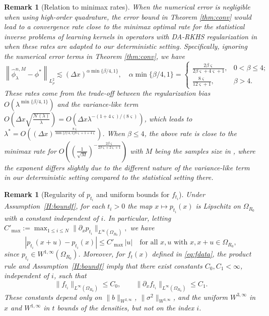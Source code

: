 \documentclass[12pt]{article}
\newtheorem{remark}[theorem]{Remark}
\numberwithin{equation}{section}
\numberwithin{theorem}{section}
\begin{document}
\begin{remark}[Relation to minimax rates]
\label{rem:minimax}
When the numerical error is negligible when using high-order quadrature, the error bound in Theorem \ref{thm:conv} would lead to a convergence rate close to the minimax optimal rate for the statistical inverse problems of learning kernels in operators with DA-RKHS regularization in {\rm\cite{zhang2025minimax}} when these rates are adapted to our deterministic setting. Specifically, ignoring the numerical error terms in Theorem \ref{thm:conv}, we have
$$
\left\|\hat{\phi}_\lambda^{n, M}-\phi^*\right\|_{L^2_{\rho}} 
\lesssim (\Delta x)^{\alpha \min \{\beta / 4,1\}}, 
\quad  
\alpha \min \{\beta / 4,1\}
= \begin{cases}
    \frac{2 \beta \varsigma}{2 \beta \varsigma+4 \varsigma+1}, & 0<\beta \leq 4;  \\ 
       \frac{8 \varsigma}{12 \varsigma+1}, & \beta>4 .
    \end{cases}
$$ 
These rates come from the trade-off between the regularization bias $O\left(\lambda^{\min \{\beta / 4,1\}}\right)$ and the variance-like term $O\left(\Delta x \sqrt{\frac{\mathcal{N}(\lambda)}{\lambda}}\right) = O\left(\Delta x  \lambda^{-(1+4\varsigma) /(8\varsigma)} \right) $, which leads to $\lambda^*= O\left((\Delta x)^{\frac{8 \varsigma}{\min \{\beta/4, 1\} 8 \varsigma+1+4 \varsigma}}\right)$. When $\beta\leq 4$, the above rate is close to the minimax rate for $ O\left((\frac{1}{\sqrt{M}})^{-\frac{2 \beta \varsigma}{2 \beta \varsigma+2 \varsigma+1} } \right) $ with $M$ being the samples size in {\rm\cite{zhang2025minimax}}, where the exponent differs slightly due to the different nature of the variance-like term in our deterministic setting compared to the statistical setting there. 
\end{remark}




\begin{remark}[Regularity of $p_{t_i}$ and uniform bounds for $f_{t_i}$]\label{rem:regularity}
Under Assumption~\ref{H:boundf}, for each $t_i>0$ the map $x \mapsto p_{t_i}(x)$ is Lipschitz on $\Omega_{R_0}$ with a constant independent of $i$. In particular, letting $C'_{\max}:=\max_{1\le i\le N}\|\partial_x p_{t_i}\|_{L^\infty(\Omega_{R_0})},$ we have
$$
|p_{t_i}(x+u)-p_{t_i}(x)| \le C'_{\max}\,|u|\quad\text{for all }x,u\text{ with }x,x+u\in\Omega_{R_0},
$$
since $p_{t_i}\in W^{1,\infty}(\Omega_{R_0})$. Moreover, for $f_t(x)$ defined in \eqref{eq:fdata}, the product rule and Assumption~\ref{H:boundf} imply that there exist constants $C_0,C_1<\infty$, independent of $i$, such that
$$
\|f_{t_i}\|_{L^\infty(\Omega_{R_0})}\le C_0,\qquad
\|\partial_x f_{t_i}\|_{L^\infty(\Omega_{R_0})}\le C_1.
$$
These constants depend only on $\|b\|_{W^{2,\infty}}$, $\|\sigma^2\|_{W^{3,\infty}}$, and the uniform $W^{3,\infty}$ in $x$ and $W^{1,\infty}$ in $t$ bounds of the densities, but not on the index $i$.
\end{remark}
\end{document}
